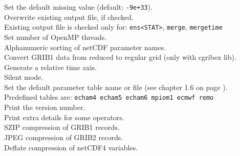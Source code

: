 \begin{tabbing}
         \> Set the default missing value (default: {\tt-9e+33}). \\
         \> Overwrite existing output file, if checked. \\
         \> Existing output file is checked only for: {\tt ens<STAT>}, {\tt merge}, {\tt mergetime} \\
         \> Set number of OpenMP threads. \\
         \> Alphanumeric sorting of netCDF parameter names. \\
         \> Convert GRIB1 data from reduced to regular grid (only with cgribex lib). \\
         \> Generate a relative time axis. \\
         \> Silent mode. \\
         \> Set the default parameter table name or file (see chapter 1.6 on page \pageref{PARAMETER_TABLE}).\\
         \> Predefined tables are:  {\tt echam4 echam5 echam6 mpiom1 ecmwf remo}\\
         \> Print the version number. \\
         \> Print extra details for some operators. \\
         \> SZIP compression of GRIB1 records. \\
         \> JPEG compression of GRIB2 records. \\
         \> Deflate compression of netCDF4 variables. \\
\end{tabbing}

